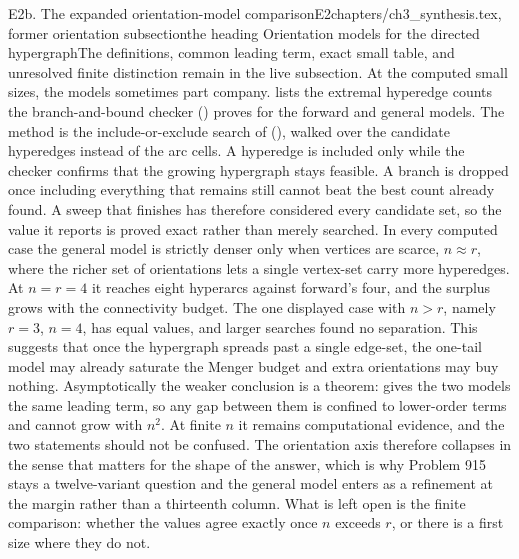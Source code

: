 \begin{offcut}{E2b. The expanded orientation-model comparison}{E2}{chapters/ch3\_synthesis.tex, former orientation subsection}{the heading Orientation models for the directed hypergraph}{The definitions, common leading term, exact small table, and unresolved finite distinction remain in the live subsection.}
At the computed small sizes, the models sometimes part company.  lists the extremal hyperedge counts the branch-and-bound checker () proves for the forward and general models. The method is the include-or-exclude search of  (), walked over the candidate hyperedges instead of the arc cells. A hyperedge is included only while the checker confirms that the growing hypergraph stays feasible. A branch is dropped once including everything that remains still cannot beat the best count already found. A sweep that finishes has therefore considered every candidate set, so the value it reports is proved exact rather than merely searched. In every computed case the general model is strictly denser only when vertices are scarce, $n \approx r$, where the richer set of orientations lets a single vertex-set carry more hyperedges. At $n = r = 4$ it reaches eight hyperarcs against forward's four, and the surplus grows with the connectivity budget. The one displayed case with $n>r$, namely $r=3$, $n=4$, has equal values, and larger searches found no separation. This suggests that once the hypergraph spreads past a single edge-set, the one-tail model may already saturate the Menger budget and extra orientations may buy nothing. Asymptotically the weaker conclusion is a theorem:  gives the two models the same leading term, so any gap between them is confined to lower-order terms and cannot grow with $n^2$. At finite $n$ it remains computational evidence, and the two statements should not be confused. The orientation axis therefore collapses in the sense that matters for the shape of the answer, which is why Problem 915 stays a twelve-variant question and the general model enters as a refinement at the margin rather than a thirteenth column. What is left open is the finite comparison: whether the values agree exactly once $n$ exceeds $r$, or there is a first size where they do not.


\end{offcut}
